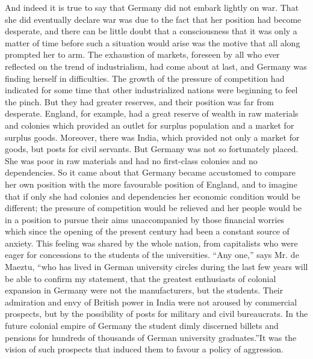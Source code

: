 \documentclass{book}
\begin{document}
And indeed it is true to say that Germany did not embark lightly on war. That she did eventually declare war was due to the fact that her position had become desperate, and there can be little doubt that a consciousness that it was only a matter of time before such a situation would arise was the motive that all along prompted her to arm. The exhaustion of markets, foreseen by all who ever reflected on the trend of industrialism, had come about at last, and Germany was finding herself in difficulties. The growth of the pressure of competition had indicated for some time that other industrialized nations were beginning to feel the pinch. But they had greater reserves, and their position was far from desperate. England, for example, had a great reserve of wealth in raw materials and colonies which provided an outlet for surplus population and a market for surplus goods. Moreover, there was India, which provided not only a market for goods, but posts for civil servants. But Germany was not so fortunately placed. She was poor in raw materials and had no first-class colonies and no dependencies. So it came about that Germany became accustomed to compare her own position with the more favourable position of England, and to imagine that if only she had colonies and dependencies her economic condition would be different; the pressure of competition would be relieved and her people would be in a position to pursue their aims unaccompanied by those financial worries which since the opening of the present century had been a constant source of anxiety. This feeling was shared by the whole nation, from capitalists who were eager for concessions to the students of the universities. “Any one,” says Mr. de Maeztu, “who has lived in German university circles during the last few years will be able to confirm my statement, that the greatest enthusiasts of colonial expansion in Germany were not the manufacturers, but the students. Their admiration and envy of British power in India were not aroused by commercial prospects, but by the possibility of posts for military and civil bureaucrats. In the future colonial empire of Germany the student dimly discerned billets and pensions for hundreds of thousands of German university graduates.”\footnotemark[1] It was the vision of such prospects that induced them to favour a policy of aggression.
\end{document}
